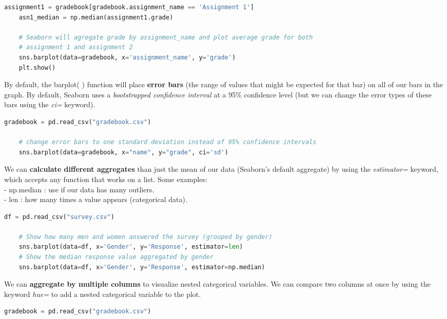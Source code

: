 \documentclass[11pt, a4paper]{article}
\begin{document}
\begin{spacing}{1.1}
\begin{lstlisting}[language=Python]
	assignment1 = gradebook[gradebook.assignment_name == 'Assignment 1']
	asn1_median = np.median(assignment1.grade)	
	
	# Seaborn will agregate grade by assignment_name and plot average grade for both 
	# assignment 1 and assignment 2
	sns.barplot(data=gradebook, x='assignment_name', y='grade')
	plt.show()\end{lstlisting}\vspace*{1mm}
	By default, the barplot( ) function will place \textbf{error bars} (the range of values that might be expected for that bar) on all of our bars in the graph. By default, Seaborn uses a \textit{bootstrapped confidence interval} at a 95\% confidence level (but we can change the error types of these bars using the \textit{ci=} keyword). 
	\begin{lstlisting}[language=Python]
	gradebook = pd.read_csv("gradebook.csv")
	
	# change error bars to one standard deviation instead of 95% confidence intervals
	sns.barplot(data=gradebook, x="name", y="grade", ci='sd')\end{lstlisting}\vspace*{1mm}
	We can \textbf{calculate different aggregates} than just the mean of our data (Seaborn's default aggregate) by using the \textit{estimator=} keyword, which accepts any function that works on a list. Some examples: \\
	\hspace*{3mm} - np.median : use if our data has many outliers. \\
	\hspace*{3mm} - len : how many times a value appears (categorical data). 
	\begin{lstlisting}[language=Python]
	df = pd.read_csv("survey.csv")
	
	# Show how many men and women answered the survey (grouped by gender)
	sns.barplot(data=df, x='Gender', y='Response', estimator=len)
	# Show the median response value aggregated by gender
	sns.barplot(data=df, x='Gender', y='Response', estimator=np.median)\end{lstlisting}\newpage
	\noindent We can \textbf{aggregate by multiple columns} to visualize nested categorical variables. We can compare two columns at once by using the keyword \textit{hue=} to add a nested categorical variable to the plot.
	\begin{minipage}[c]{9cm}
	\begin{lstlisting}[language=Python]
	gradebook = pd.read_csv("gradebook.csv")
	

\end{lstlisting}
\end{minipage}
\end{spacing}
\end{document}
